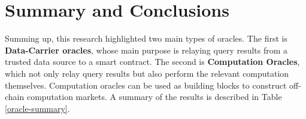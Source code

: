 \section{Summary and Conclusions}


Summing up, this research highlighted two main types of oracles. The first is \textbf{Data-Carrier oracles}, whose main purpose is relaying query results from a trusted data source to a smart contract. The second is \textbf{Computation Oracles}, which not only relay query results but also perform the relevant computation themselves. Computation oracles can be used as building blocks to construct off-chain computation markets. A summary of the results is described in Table \ref{oracle-summary}.



